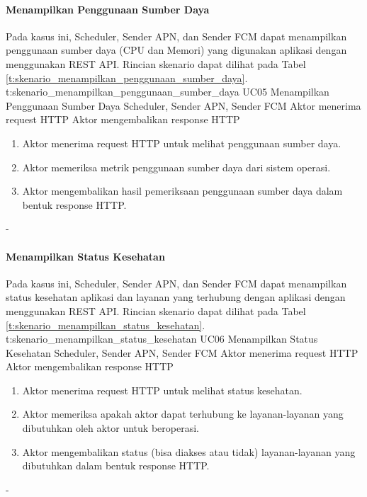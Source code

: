 \paragraph{Menampilkan Penggunaan Sumber Daya}
\par Pada kasus ini, Scheduler, Sender APN, dan Sender FCM dapat menampilkan penggunaan sumber daya (CPU dan Memori) yang digunakan aplikasi dengan menggunakan REST API. Rincian skenario dapat dilihat pada Tabel \ref{t:skenario_menampilkan_penggunaan_sumber_daya}.
\tableUcDesc
{t:skenario_menampilkan_penggunaan_sumber_daya}
{UC05}
{Menampilkan Penggunaan Sumber Daya}
{Scheduler, Sender APN, Sender FCM}
{Aktor menerima request HTTP}
{Aktor mengembalikan response HTTP}
{
	\begin{enumerate}
		\item Aktor menerima request HTTP untuk melihat penggunaan sumber daya.
		\item Aktor memeriksa metrik penggunaan sumber daya dari sistem operasi.
		\item Aktor mengembalikan hasil pemeriksaan penggunaan sumber daya dalam bentuk response HTTP.
	\end{enumerate}
}
{-}

\paragraph{Menampilkan Status Kesehatan}
\par Pada kasus ini, Scheduler, Sender APN, dan Sender FCM dapat menampilkan status kesehatan aplikasi dan layanan yang terhubung dengan aplikasi dengan menggunakan REST API. Rincian skenario dapat dilihat pada Tabel \ref{t:skenario_menampilkan_status_kesehatan}.
\tableUcDesc
{t:skenario_menampilkan_status_kesehatan}
{UC06}
{Menampilkan Status Kesehatan}
{Scheduler, Sender APN, Sender FCM}
{Aktor menerima request HTTP}
{Aktor mengembalikan response HTTP}
{
	\begin{enumerate}
		\item Aktor menerima request HTTP untuk melihat status kesehatan.
		\item Aktor memeriksa apakah aktor dapat terhubung ke layanan-layanan yang dibutuhkan oleh aktor untuk beroperasi.
		\item Aktor mengembalikan status (bisa diakses atau tidak) layanan-layanan yang dibutuhkan dalam bentuk response HTTP.
	\end{enumerate}
}
{-}


